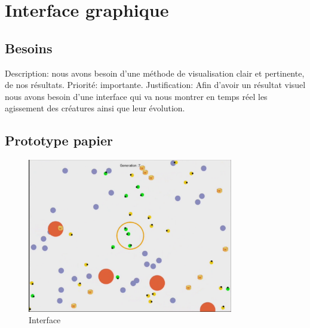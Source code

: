 \section{Interface graphique}
\subsection{Besoins}
Description: nous avons besoin d'une méthode de visualisation clair et pertinente, de nos résultats.
Priorité: importante.
Justification: Afin d’avoir un résultat visuel nous avons besoin d’une interface qui va nous 
montrer en temps réel les agissement des créatures ainsi que leur évolution.

\subsection{Prototype papier}
\begin{figure}[H]
    \centering
    \includegraphics[width=0.8\textwidth]{./pictures/prototype.png}
    \caption{Interface}
    \label{fig:awesome_image}
\end{figure}


\clearpage
